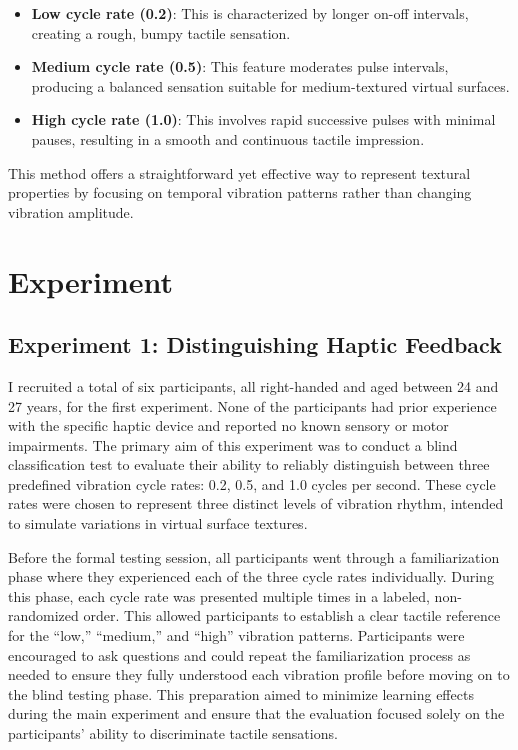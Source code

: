 \begin{itemize}
  \item \textbf{Low cycle rate (0.2)}: This is characterized by longer on-off intervals, creating a rough, bumpy tactile sensation.
  \item \textbf{Medium cycle rate (0.5)}: This feature moderates pulse intervals, producing a balanced sensation suitable for medium-textured virtual surfaces.
  \item \textbf{High cycle rate (1.0)}: This involves rapid successive pulses with minimal pauses, resulting in a smooth and continuous tactile impression.
\end{itemize}

This method offers a straightforward yet effective way to represent textural properties by focusing on temporal vibration patterns rather than changing vibration amplitude.

\newpage
\section{Experiment}

\subsection{Experiment 1: Distinguishing Haptic Feedback}
I recruited a total of six participants, all right-handed and aged between 24 and 27 years, for the first experiment. None of the participants had prior experience with the specific haptic device and reported no known sensory or motor impairments. The primary aim of this experiment was to conduct a blind classification test to evaluate their ability to reliably distinguish between three predefined vibration cycle rates: 0.2, 0.5, and 1.0 cycles per second. These cycle rates were chosen to represent three distinct levels of vibration rhythm, intended to simulate variations in virtual surface textures.

Before the formal testing session, all participants went through a familiarization phase where they experienced each of the three cycle rates individually. During this phase, each cycle rate was presented multiple times in a labeled, non-randomized order. This allowed participants to establish a clear tactile reference for the “low,” “medium,” and “high” vibration patterns. Participants were encouraged to ask questions and could repeat the familiarization process as needed to ensure they fully understood each vibration profile before moving on to the blind testing phase. This preparation aimed to minimize learning effects during the main experiment and ensure that the evaluation focused solely on the participants' ability to discriminate tactile sensations.

